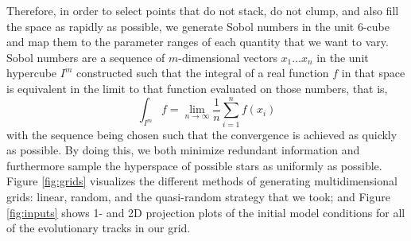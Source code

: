 \documentclass[manuscript]{aastex}
\begin{document}
Therefore, in order to select points that do not stack, do not clump, and also fill the space as rapidly as possible, we generate Sobol numbers \citep{sobol1967distribution} in the unit 6-cube and map them to the parameter ranges of each quantity that we want to vary. Sobol numbers are a sequence of $m$-dimensional vectors $x_1 \ldots x_n$ in the unit hypercube $I^m$ constructed such that the integral of a real function $f$ in that space is equivalent in the limit to that function evaluated on those numbers, that is,
\begin{equation}
    \int_{I^m} f = \lim_{n \to \infty} \frac{1}{n}\sum_{i=1}^n f(x_i)
\end{equation}
with the sequence being chosen such that the convergence is achieved as quickly as possible. By doing this, we both minimize redundant information and furthermore sample the hyperspace of possible stars as uniformly as possible. Figure \ref{fig:grids} visualizes the different methods of generating multidimensional grids: linear, random, and the quasi-random strategy that we took; and Figure \ref{fig:inputs} shows 1- and 2D projection plots of the initial model conditions for all of the evolutionary tracks in our grid. 

\begin{figure*}
    \centering
    \caption{Results of different methods for generating multidimensional grids portrayed via a unit cube projected onto a unit square. Linear (left), random (middle), and quasi-random (right) grids are generated in three dimensions, with color depicting the third dimension, i.e., the distance between the reader and the screen. %
    From top to bottom, all three methods are shown with 100, 400, and 2000 points generated, respectively. }%
    \label{fig:grids}
\end{figure*}
\end{document}
